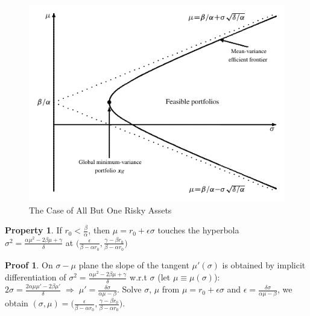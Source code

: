 \documentclass[11pt]{extarticle}
\newcommand{\ds}{\displaystyle}
\newcommand{\ie}{\;\Longrightarrow\;}
\theoremstyle{definition}
\newtheorem*{prp}{Property}
\newtheorem*{prf}{Proof}
\begin{document}
\begin{figure}[!htbp]
  \centering
  \includegraphics[scale=1,page=3]{fig/sfm.pdf}
  \caption{The Case of All But One Risky Assets}
  \label{fig:mv3}
\end{figure}

\begin{prp}
  If $\ds r_0 < \frac{\beta}{\alpha}$, then $\mu = r_0 + \epsilon\sigma$ touches the hyperbola \\$\ds\sigma^2 = \frac{\alpha\mu^2 - 2\beta\mu + \gamma}{\delta}$ at $\ds\Big(\frac{\epsilon}{\beta - \alpha r_0}, \frac{\gamma - \beta r_0}{\beta - \alpha r_0}\Big)$
\end{prp}

\begin{prf}
  On $\sigma-\mu$ plane the slope of the tangent $\mu'(\sigma)$ is obtained by implicit differentiation of $\ds\sigma^2 = \frac{\alpha\mu^2 - 2\beta\mu + \gamma}{\delta}$ w.r.t $\sigma$ (let $\ds\mu\equiv\mu(\sigma)$): \\$\ds 2\sigma = \frac{2\alpha\mu\mu' - 2\beta\mu'}{\delta}\ie \mu' = \frac{\delta\sigma}{\alpha\mu - \beta}$. Solve $\sigma$, $\mu$ from $\ds\mu = r_0 + \epsilon\sigma$ and $\ds\epsilon = \frac{\delta\sigma}{\alpha\mu - \beta}$, we obtain $\ds(\sigma,\mu) = \Big(\frac{\epsilon}{\beta - \alpha r_0}, \frac{\gamma - \beta r_0}{\beta - \alpha r_0}\Big)$.
\end{prf}
\end{document}
